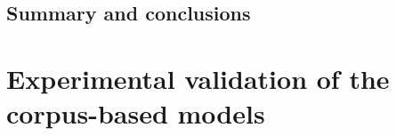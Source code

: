 \documentclass[USenglish]{article}
\begin{document}
%
%
%




\subsection{Summary and conclusions}
\label{sec:modelssummary}






\section{Experimental validation of the corpus-based models}
\label{sec:externalvalidation}
\end{document}
